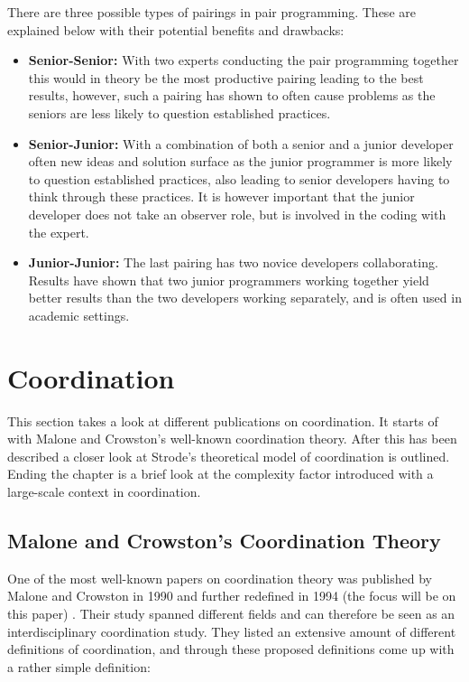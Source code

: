 There are three possible types of pairings in pair programming. These are explained below with their potential benefits and drawbacks:

\begin{itemize}
  \item \textbf{Senior-Senior:} With two experts conducting the pair programming together this would in theory be the most productive pairing leading to the best results, however, such a pairing has shown to often cause problems as the seniors are less likely to question established practices.
  \item \textbf{Senior-Junior:} With a combination of both a senior and a junior developer often new ideas and solution surface as the junior programmer is more likely to question established practices, also leading to senior developers having to think through these practices. It is however important that the junior developer does not take an observer role, but is involved in the coding with the expert.
  \item \textbf{Junior-Junior:} The last pairing has two novice developers collaborating. Results have shown that two junior programmers working together yield better results than the two developers working separately, and is often used in academic settings.
\end{itemize}

\section{Coordination}

This section takes a look at different publications on coordination. It starts of with Malone and Crowston's well-known coordination theory. After this has been described a closer look at Strode's theoretical model of coordination is outlined. Ending the chapter is a brief look at the complexity factor introduced with a large-scale context in coordination.

\subsection{Malone and Crowston's Coordination Theory}

One of the most well-known papers on coordination theory was published by Malone and Crowston in 1990 and further redefined in 1994 (the focus will be on this paper) \cite{Malone1994}. Their study spanned different fields and can therefore be seen as an interdisciplinary coordination study. They listed an extensive amount of different definitions of coordination, and through these proposed definitions come up with a rather simple definition:


